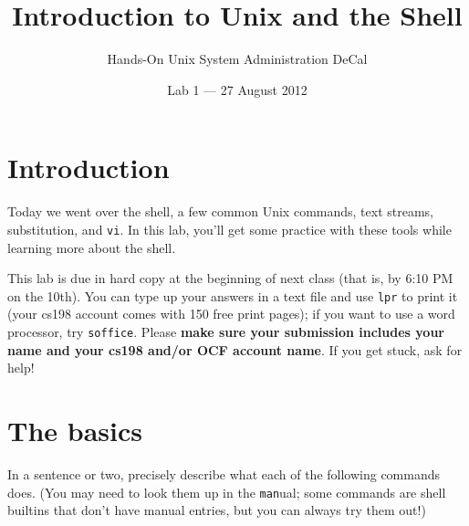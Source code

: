 \documentclass{article}
\begin{document}
\title{Introduction to {\sc Unix} and the Shell}
\author{Hands-On {\sc Unix} System Administration DeCal}
\date{Lab 1 --- 27 August 2012}

\maketitle

\section*{Introduction}
Today we went over the shell, a few common {\sc Unix} commands, text streams, substitution, and \texttt{vi}.  In this lab, you'll get some practice with these tools while learning more about the shell.

This lab is due in hard copy at the beginning of next class (that is, by 6:10 PM on the 10th).  You can type up your answers in a text file and use \texttt{lpr} to print it (your cs198 account comes with 150 free print pages); if you want to use a word processor, try \texttt{soffice}.  Please \textbf{make sure your submission includes your name and your cs198 and/or OCF account name}.  If you get stuck, ask for help!

\section{The basics}
In a sentence or two, precisely describe what each of the following commands does.  (You may need to look them up in the \texttt{man}ual; some commands are shell builtins that don't have manual entries, but you can always try them out!)
\end{document}
